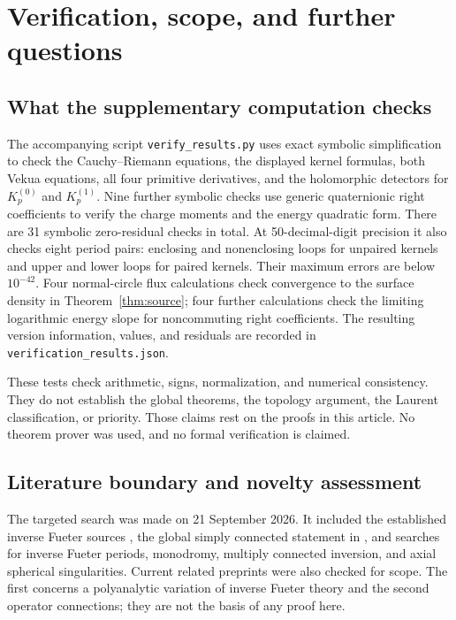 \documentclass[11pt,a4paper]{article}
\numberwithin{equation}{section}
\theoremstyle{definition}
\theoremstyle{remark}
\begin{document}
\section{Verification, scope, and further questions}
\label{sec:verification}

\subsection{What the supplementary computation checks}
The accompanying script \texttt{verify\_results.py} uses exact symbolic
simplification to check the Cauchy--Riemann equations, the displayed kernel
formulas, both Vekua equations, all four primitive derivatives, and the
holomorphic detectors for $K_p^{(0)}$ and $K_p^{(1)}$. Nine further symbolic checks use generic quaternionic right coefficients
to verify the charge moments and the energy quadratic form. There are 31
symbolic zero-residual checks in total. At 50-decimal-digit precision it also checks eight
period pairs: enclosing and nonenclosing loops for unpaired kernels and upper
and lower loops for paired kernels. Their maximum errors are below
$10^{-42}$. Four normal-circle flux calculations check convergence to the
surface density in Theorem~\ref{thm:source}; four further calculations check
the limiting logarithmic energy slope for noncommuting right coefficients.
The resulting version information,
values, and residuals are recorded in \texttt{verification\_results.json}.

These tests check arithmetic, signs, normalization, and numerical consistency.
They do not establish the global theorems, the topology argument, the Laurent
classification, or priority. Those claims rest on the proofs in this article.
No theorem prover was used, and no formal verification is claimed.

\subsection{Literature boundary and novelty assessment}
The targeted search was made on 21 September 2026. It included the established
inverse Fueter sources \cite{CSS,CPSS}, the global simply connected statement
in \cite{Perotti}, and searches for inverse Fueter periods, monodromy,
multiply connected inversion, and axial spherical singularities. Current
related preprints \cite{DS26,GGBS26} were also checked for scope. The first
concerns a polyanalytic variation of inverse Fueter theory and the second
operator connections; they are not the basis of any proof here.
\end{document}
